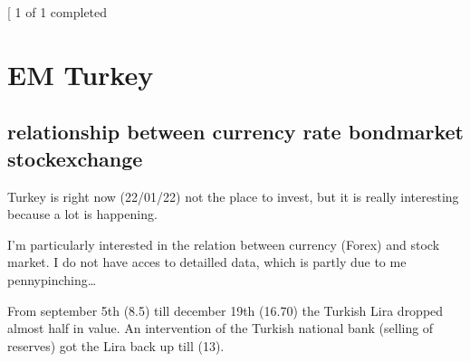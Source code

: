 \documentclass[letterpaper,10pt,english]{sphinxmanual}
\begin{document}
\begin{sphinxVerbatim}[commandchars=\\\{\}]
\end{sphinxVerbatim}

\noindent{}

\sphinxAtStartPar
{}
\begin{sphinxalltt}
{[}\sphinxstylestrong{*******************100\%*********************}{]}  1 of 1 completed
\end{sphinxalltt}

\begin{sphinxVerbatim}[commandchars=\\\{\}]
\end{sphinxVerbatim}

\noindent{}

\sphinxAtStartPar
{}

\sphinxstepscope


\chapter{EM Turkey}
\label{\detokenize{turkey:em-turkey}}\label{\detokenize{turkey::doc}}

\section{relationship between currency rate \sphinxhyphen{} bondmarket \sphinxhyphen{} stockexchange}
\label{\detokenize{turkey:relationship-between-currency-rate-bondmarket-stockexchange}}
\sphinxAtStartPar
Turkey is right now (22/01/22) not the place to invest, but it is really
interesting because a lot is happening.

\sphinxAtStartPar
I’m particularly interested in the relation between currency (Forex) and
stock market. I do not have acces to detailled data, which is partly due
to me pennypinching…

\sphinxAtStartPar
From september 5th (8.5) till december 19th (16.70) the Turkish Lira
dropped almost half in value. An intervention of the Turkish national
bank (selling of reserves) got the Lira back up till (13).
\end{document}
